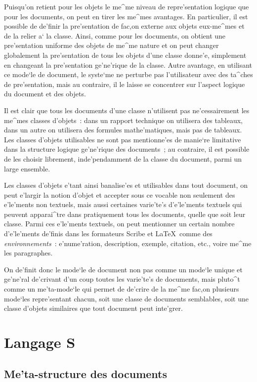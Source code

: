 Puisqu'on retient pour les objets le me^me niveau de repre'sentation logique
que pour les documents, on peut en tirer les me^mes avantages. En particulier,
il est possible de de'finir la pre'sentation de fac,on externe aux objets
eux-me^mes et de la relier a` la classe. Ainsi, comme pour les documents, on
obtient une pre'sentation uniforme des objets de me^me nature et on peut
changer globalement la pre'sentation de tous les objets d'une classe donne'e,
simplement en changeant la pre'sentation ge'ne'rique de la classe. Autre
avantage, en utilisant ce mode`le de document, le syste`me ne perturbe pas
l'utilisateur avec des ta^ches de pre'sentation, mais au contraire, il le
laisse se concentrer sur l'aspect logique du document et des objets.

Il est clair que tous les documents d'une classe n'utilisent pas
ne'cessairement les me^mes classes d'objets~:
dans un rapport technique on utilisera des
tableaux, dans un autre on utilisera des formules mathe'matiques, mais pas
de tableaux. Les classes d'objets utilisables ne sont pas mentionne'es
de manie`re limitative dans la structure logique ge'ne'rique des documents~;
au contraire, il est possible de les choisir librement, inde'pendamment
de la classe du document, parmi un large ensemble.

Les classes d'objets e'tant ainsi banalise'es et utilisables dans tout
document, on peut e'largir la notion d'objet et accepter sous ce vocable non
seulement des e'le'ments non textuels, mais aussi certaines varie'te's d'e'le'ments
textuels qui peuvent apparai^tre dans pratiquement tous les documents, quelle
que soit leur classe. Parmi ces e'le'ments textuels, on peut mentionner un
certain nombre d'e'le'ments de'finis dans les formateurs Scribe et \LaTeX\
comme des {\em environnements}~: e'nume'ration, description, exemple, citation,
etc., voire me^me les paragraphes.

On de'finit donc le mode`le de document non pas comme un mode`le unique et
ge'ne'ral de'crivant d'un coup toutes les varie'te's de documents, mais
pluto^t comme un me'ta-mode`le qui permet de de'crire de la me^me fac,on
plusieurs mode`les repre'sentant chacun, soit une classe de documents
semblables, soit une classe d'objets similaires que tout document peut
inte'grer.


\chapter{Langage S}

\section{Me'ta-structure des documents}


